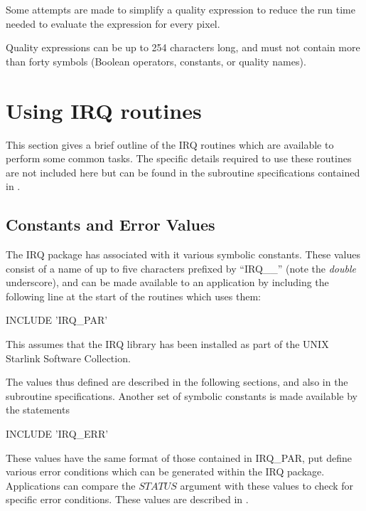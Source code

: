 \documentclass[twoside,11pt,nolof]{starlink}
\begin{document}
Some attempts are made to simplify a quality expression to reduce the
run time needed to evaluate the expression for every pixel.

Quality expressions can be up to 254 characters long, and must not
contain more than forty symbols (Boolean operators, constants, or
quality names).

\section {Using IRQ routines}

This section gives a brief outline of the IRQ routines which are
available to perform some common tasks. The specific details required
to use these routines are not included here but can be found in the
subroutine specifications contained in .

\subsection {Constants and Error Values}
\label {SEC:CON}

The IRQ package has associated with it various symbolic constants.
These values consist of a name of up to five characters prefixed by
``IRQ\_\_'' (note the \emph{double} underscore), and can be made
available to an application by including the following line at the
start of the routines which uses them:

\begin{terminalv}
      INCLUDE 'IRQ_PAR'
\end{terminalv}

This assumes that the IRQ library has been installed as part of the
UNIX Starlink Software Collection.

The values thus defined are described in the following sections, and
also in the subroutine specifications. Another set of symbolic
constants is made available by the statements

\begin{terminalv}
      INCLUDE 'IRQ_ERR'
\end{terminalv}

These values have the same format of those contained in IRQ\_PAR, put define
various error conditions which can be generated within the IRQ package.
Applications can compare the $STATUS$ argument with these values to check for
specific error conditions. These values are described in
.
\end{document}
